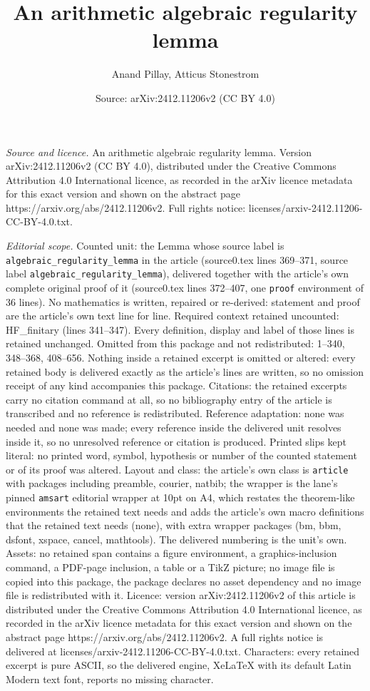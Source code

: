 \documentclass[10pt,a4paper]{amsart}
\title[An arithmetic algebraic regularity lemma]{An arithmetic algebraic regularity lemma}
\author{Anand Pillay, Atticus Stonestrom}
\date{Source: arXiv:2412.11206v2 (CC BY 4.0)}
\begin{document}
\maketitle

\noindent\emph{Source and licence.} An arithmetic algebraic regularity lemma. Version arXiv:2412.11206v2 (CC BY 4.0), distributed under the Creative Commons Attribution 4.0 International licence, as recorded in the arXiv licence metadata for this exact version and shown on the abstract page https://arxiv.org/abs/2412.11206v2. Full rights notice: licenses/arxiv-2412.11206-CC-BY-4.0.txt.\par\smallskip

\noindent\textit{Editorial scope.} Counted unit: the Lemma whose source label is \texttt{algebraic\_regularity\_lemma} in the article (source0.tex lines 369--371, source label \texttt{algebraic\_regularity\_lemma}), delivered together with the article's own complete original proof of it (source0.tex lines 372--407, one \texttt{proof} environment of 36 lines). No mathematics is written, repaired or re-derived: statement and proof are the article's own text line for line. Required context retained uncounted: HF\_finitary (lines 341--347). Every definition, display and label of those lines is retained unchanged. Omitted from this package and not redistributed: 1--340, 348--368, 408--656. Nothing inside a retained excerpt is omitted or altered: every retained body is delivered exactly as the article's lines are written, so no omission receipt of any kind accompanies this package. Citations: the retained excerpts carry no citation command at all, so no bibliography entry of the article is transcribed and no reference is redistributed. Reference adaptation: none was needed and none was made; every reference inside the delivered unit resolves inside it, so no unresolved reference or citation is produced. Printed slips kept literal: no printed word, symbol, hypothesis or number of the counted statement or of its proof was altered. Layout and class: the article's own class is \texttt{article} with packages including preamble, courier, natbib; the wrapper is the lane's pinned \texttt{amsart} editorial wrapper at 10pt on A4, which restates the theorem-like environments the retained text needs and adds the article's own macro definitions that the retained text needs (none), with extra wrapper packages (bm, bbm, dsfont, xspace, cancel, mathtools). The delivered numbering is the unit's own. Assets: no retained span contains a figure environment, a graphics-inclusion command, a PDF-page inclusion, a table or a TikZ picture; no image file is copied into this package, the package declares no asset dependency and no image file is redistributed with it. Licence: version arXiv:2412.11206v2 of this article is distributed under the Creative Commons Attribution 4.0 International licence, as recorded in the arXiv licence metadata for this exact version and shown on the abstract page https://arxiv.org/abs/2412.11206v2. A full rights notice is delivered at licenses/arxiv-2412.11206-CC-BY-4.0.txt. Characters: every retained excerpt is pure ASCII, so the delivered engine, XeLaTeX with its default Latin Modern text font, reports no missing character.
\end{document}

